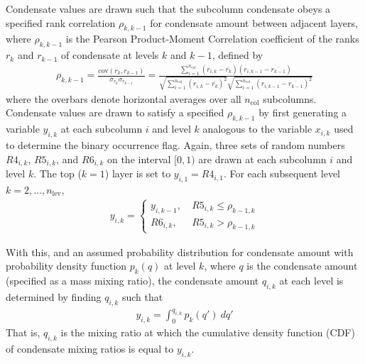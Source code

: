 Condensate values are drawn such that the subcolumn condensate obeys a
specified rank correlation \(\rho_{k, k-1}\) for condensate amount
between adjacent layers, where \(\rho_{k, k-1}\) is the Pearson
Product-Moment Correlation coefficient of the ranks \(r_{k}\) and
\(r_{k-1}\) of condensate at levels \(k\) and \(k-1\), defined by
\begin{equation}\begin{gathered} 
    \rho_{k, k-1} = \frac{
        \textrm{cov}(r_{k}, r_{k-1})
    }{
        \sigma_{r_{k}} \sigma_{r_{k-1}} 
    } = \frac{
        \sum_{i=1}^{n_\textrm{col}} (r_{i, k} - \overline{r_{k}})(r_{i, k-1} - \overline{r_{k-1}}) 
    }{
        \sqrt{\sum_{i=1}^{n_\textrm{col}} (r_{i, k} - \overline{r_{k}})^2} \sqrt{\sum_{i=1}^{n_\textrm{col}} (r_{i, k-1} - \overline{r_{k-1}})^2} 
    } \end{gathered}\label{eq:rankcorr_equation}\end{equation} where the
overbars denote horizontal averages over all \(n_\textrm{col}\)
subcolumns. Condensate values are drawn to satisfy a specified
\(\rho_{k, k-1}\) by first generating a variable \(y_{i, k}\) at each
subcolumn \(i\) and level \(k\) analogous to the variable \(x_{i, k}\)
used to determine the binary occurrence flag. Again, three sets of
random numbers \(R4_{i, k}\), \(R5_{i, k}\), and \(R6_{i, k}\) on the
interval \([0, 1)\) are drawn at each subcolumn \(i\) and level \(k\).
The top (\(k = 1\)) layer is set to \(y_{i, 1} = R4_{i, 1}\). For each
subsequent level \(k = 2, \ldots, n_\textrm{lev}\), \[\begin{gathered} 
    y_{i, k} = \begin{cases} 
        y_{i, k-1}, ~ & R5_{i, k} \le \rho_{k-1, k} \\ 
        R6_{i, k},  ~ & R5_{i, k} > \rho_{k-1, k} 
    \end{cases}
\end{gathered}\]

With this, and an assumed probability distribution for condensate amount
with probability density function \(p_k(q)\) at level \(k\), where \(q\)
is the condensate amount (specified as a mass mixing ratio), the
condensate amount \(q_{i, k}\) at each level is determined by finding
\(q_{i, k}\) such that \[\begin{gathered} 
    y_{i, k} = \int_0^{q_{i, k}} p_{k}(q') ~dq'
\end{gathered}\] That is, \(q_{i, k}\) is the mixing ratio at which the
cumulative density function (CDF) of condensate mixing ratios is equal
to \(y_{i, k}\).

